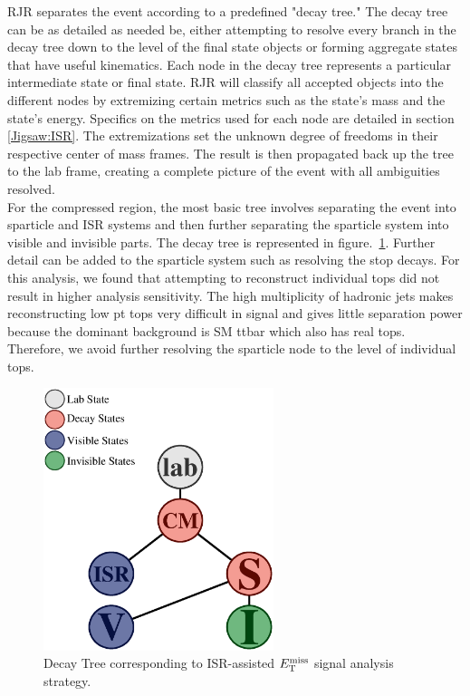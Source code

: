 \indent RJR separates the event according to a predefined "decay tree."  The decay tree can be as detailed as needed be, either attempting to resolve every branch in the decay tree down to the level of the final state objects or forming aggregate states that have useful kinematics.   Each node in the decay tree represents a particular intermediate state or final state.  RJR will classify all accepted objects into the different nodes by extremizing certain metrics such as the state's mass and the state's energy.  Specifics on the metrics used for each node are detailed in section \ref{Jigsaw:ISR}.  The extremizations set the unknown degree of freedoms in their respective center of mass frames.  The result is then propagated back up the tree to the lab frame, creating a complete picture of the event with all ambiguities resolved.\\

\indent For the compressed region, the most basic tree involves separating the event into sparticle and ISR systems and then further separating the sparticle system into visible and invisible parts. The decay tree is represented in figure.~\ref{fig:DecayTree}.  Further detail can be added to the sparticle system such as resolving the stop decays.  For this analysis, we found that attempting to reconstruct individual tops did not result in higher analysis sensitivity.   The high multiplicity of hadronic jets makes reconstructing low pt tops very difficult in signal and gives little separation power because the dominant background is SM ttbar which also has real tops.  Therefore, we avoid further resolving the sparticle node to the level of individual tops. \\

\begin{figure}[h]
\centering
\includegraphics[width=0.6\textwidth]{./figures/strategy/DecayTree.eps}
\caption{Decay Tree corresponding to ISR-assisted $E_{\mathrm{T}}^{\mathrm{miss}}$ signal analysis strategy. \label{fig:DecayTree}}
\end{figure}

